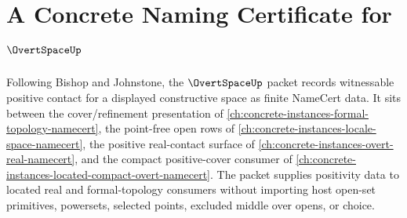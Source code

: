 \chapter{A Concrete Naming Certificate for $\OvertSpaceUp$}
\label{ch:concrete-instances-overt-space-namecert}

Following Bishop and Johnstone, the $\OvertSpaceUp$ packet records witnessable positive contact for a displayed constructive space as finite NameCert data. It sits between the cover/refinement presentation of \autoref{ch:concrete-instances-formal-topology-namecert}, the point-free open rows of \autoref{ch:concrete-instances-locale-space-namecert}, the positive real-contact surface of \autoref{ch:concrete-instances-overt-real-namecert}, and the compact positive-cover consumer of \autoref{ch:concrete-instances-located-compact-overt-namecert}. The packet supplies positivity data to located real and formal-topology consumers without importing host open-set primitives, powersets, selected points, excluded middle over opens, or choice.

